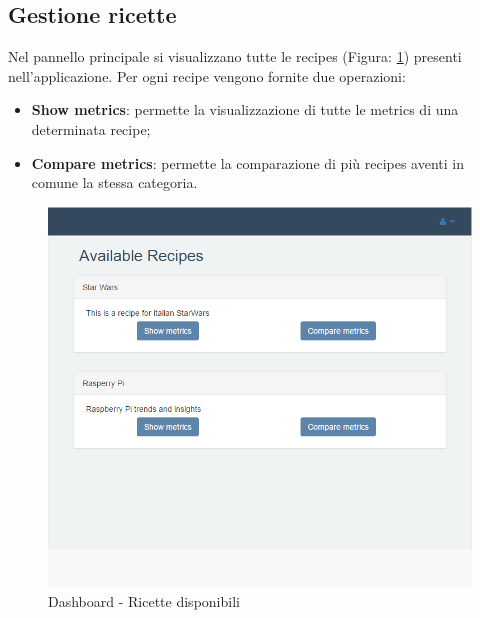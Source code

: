 	\pagebreak
	\subsection{Gestione ricette} %
	\label{sec:gestione_ricette}
		Nel pannello principale si visualizzano tutte le recipes\gloss{} (Figura: \ref{fig:ricette_disponibili}) presenti nell'applicazione.\newline
		Per ogni recipe\gloss{} vengono fornite due operazioni:
		\begin{itemize}
			\item \textbf{Show metrics}: permette la visualizzazione di tutte le metrics\gloss{} di una determinata recipe\gloss{};
			\item \textbf{Compare metrics}: permette la comparazione di più recipes\gloss{} aventi in comune la stessa categoria.
		\end{itemize}

		\begin{figure}[H]
			\centering
			\centerline{\includegraphics[width=14cm]{images/ricette_disponibili.png}}
			\caption{Dashboard - Ricette disponibili}
			\label{fig:ricette_disponibili}
		\end{figure}


		\pagebreak
